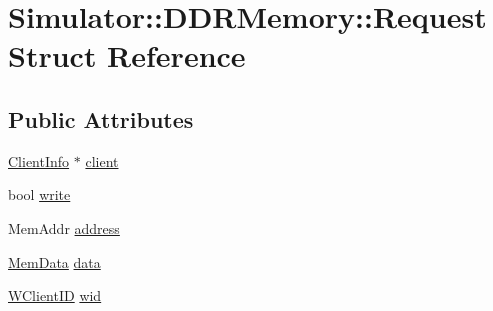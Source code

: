 \hypertarget{struct_simulator_1_1_d_d_r_memory_1_1_request}{\section{Simulator\+:\+:D\+D\+R\+Memory\+:\+:Request Struct Reference}
\label{struct_simulator_1_1_d_d_r_memory_1_1_request}
}
\subsection*{Public Attributes}
\begin{DoxyCompactItemize}
\item 
\hyperlink{struct_simulator_1_1_d_d_r_memory_1_1_client_info}{Client\+Info} $\ast$ \hyperlink{struct_simulator_1_1_d_d_r_memory_1_1_request_ae73f9c296bc40021bc2b8c88058ac25c}{client}
\item 
bool \hyperlink{struct_simulator_1_1_d_d_r_memory_1_1_request_aeb2425d6ca513688bf087e1219a0ee4b}{write}
\item 
Mem\+Addr \hyperlink{struct_simulator_1_1_d_d_r_memory_1_1_request_a38b7d1494762cd21c779e85744f764d8}{address}
\item 
\hyperlink{struct_simulator_1_1_mem_data}{Mem\+Data} \hyperlink{struct_simulator_1_1_d_d_r_memory_1_1_request_a576cc3f54dc382f02183f0db7528ca01}{data}
\item 
\hyperlink{namespace_simulator_a0de605c35951a450d074222efcef6359}{W\+Client\+I\+D} \hyperlink{struct_simulator_1_1_d_d_r_memory_1_1_request_a2230417dcd80ebdc4f391e058d50965f}{wid}
\end{DoxyCompactItemize}


